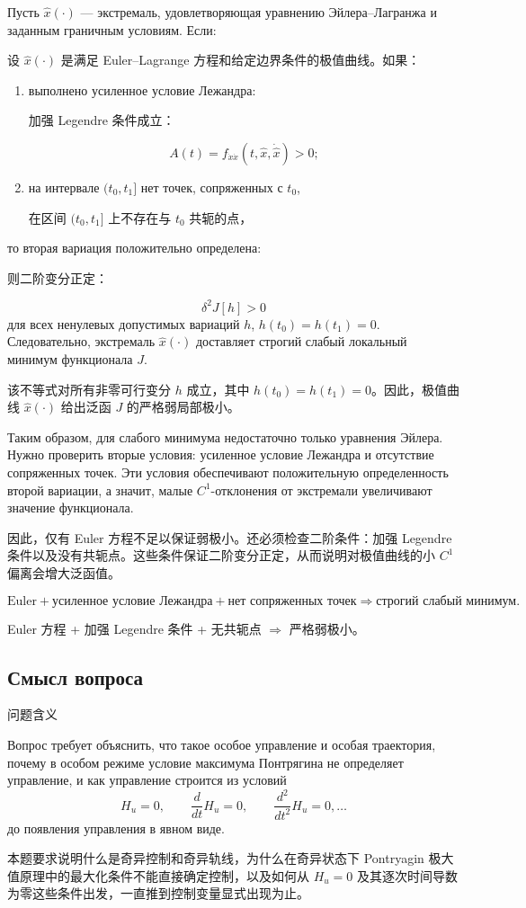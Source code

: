 \documentclass[12pt,a4paper]{article}
\newcommand{\plainheading}[2]{\par\bigskip\noindent{\large #1}\par\noindent{\large #2}\par\medskip}
\newcommand{\zh}[1]{\par\noindent #1\par}
\begin{document}
Пусть \(\widehat x(\cdot)\) --- экстремаль, удовлетворяющая уравнению Эйлера--Лагранжа и заданным граничным условиям. Если:
\zh{设 \(\widehat x(\cdot)\) 是满足 Euler--Lagrange 方程和给定边界条件的极值曲线。如果：}
\begin{enumerate}
    \item выполнено усиленное условие Лежандра:
    \zh{加强 Legendre 条件成立：}
    \[
    A(t)=f_{\dot x\dot x}(t,\widehat x,\dot{\widehat x})>0;
    \]
    \item на интервале \((t_0,t_1]\) нет точек, сопряженных с \(t_0\),
    \zh{在区间 \((t_0,t_1]\) 上不存在与 \(t_0\) 共轭的点，}
\end{enumerate}
то вторая вариация положительно определена:
\zh{则二阶变分正定：}
\[
\delta^2J[h]>0
\]
для всех ненулевых допустимых вариаций \(h\), \(h(t_0)=h(t_1)=0\). Следовательно, экстремаль \(\widehat x(\cdot)\) доставляет строгий слабый локальный минимум функционала \(J\).
\zh{该不等式对所有非零可行变分 \(h\) 成立，其中 \(h(t_0)=h(t_1)=0\)。因此，极值曲线 \(\widehat x(\cdot)\) 给出泛函 \(J\) 的严格弱局部极小。}

Таким образом, для слабого минимума недостаточно только уравнения Эйлера. Нужно проверить вторые условия: усиленное условие Лежандра и отсутствие сопряженных точек. Эти условия обеспечивают положительную определенность второй вариации, а значит, малые \(C^1\)-отклонения от экстремали увеличивают значение функционала.
\zh{因此，仅有 Euler 方程不足以保证弱极小。还必须检查二阶条件：加强 Legendre 条件以及没有共轭点。这些条件保证二阶变分正定，从而说明对极值曲线的小 \(C^1\) 偏离会增大泛函值。}

\plainheading{Краткая схема}{简要框架}
\[
\text{Euler}+
\text{усиленное условие Лежандра}+
\text{нет сопряженных точек}
\Rightarrow
\text{строгий слабый минимум}.
\]
\zh{Euler 方程 + 加强 Legendre 条件 + 无共轭点 \(\Rightarrow\) 严格弱极小。}



\subsection*{Смысл вопроса}
\zh{问题含义}
Вопрос требует объяснить, что такое особое управление и особая траектория, почему в особом режиме условие максимума Понтрягина не определяет управление, и как управление строится из условий
\[
H_u=0,\qquad \frac{d}{dt}H_u=0,\qquad \frac{d^2}{dt^2}H_u=0,\ldots
\]
до появления управления в явном виде.
\zh{本题要求说明什么是奇异控制和奇异轨线，为什么在奇异状态下 Pontryagin 极大值原理中的最大化条件不能直接确定控制，以及如何从 \(H_u=0\) 及其逐次时间导数为零这些条件出发，一直推到控制变量显式出现为止。}
\end{document}

